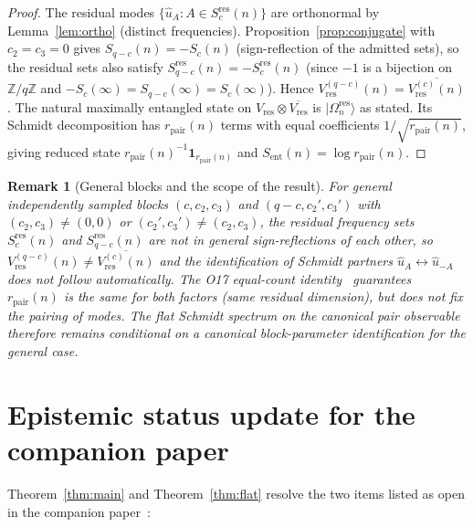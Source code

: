 \documentclass[11pt]{article}
\newtheorem{remark}{Remark}
\newcommand{\Sent}{S_{\mathrm{ent}}}
\newcommand{\rpair}{r_{\mathrm{pair}}}
\newcommand{\ue}{\hat{u}}
\begin{document}
    \begin{proof}
      The residual modes $\{\ue_A : A\in S_c^{\mathrm{res}}(n)\}$ are orthonormal by
      Lemma~\ref{lem:ortho} (distinct frequencies).
      Proposition~\ref{prop:conjugate} with $c_2=c_3=0$ gives $S_{q-c}(n)=-S_c(n)$
      (sign-reflection of the admitted sets), so the residual sets also satisfy
      $S_{q-c}^{\mathrm{res}}(n) = -S_c^{\mathrm{res}}(n)$ (since $-1$ is a bijection on
      $\mathbb{Z}/q\mathbb{Z}$ and $-S_c(\infty)=S_{q-c}(\infty)=S_c(\infty)$).
      Hence $V^{(q-c)}_{\mathrm{res}}(n)=\overline{V^{(c)}_{\mathrm{res}}(n)}$.
      The natural maximally entangled state on $V_{\mathrm{res}}\otimes\overline{V_{\mathrm{res}}}$
      is $|\Omega^{\mathrm{res}}_n\rangle$ as stated.
      Its Schmidt decomposition has $\rpair(n)$ terms with equal coefficients
      $1/\sqrt{\rpair(n)}$, giving reduced state $\rpair(n)^{-1}\mathbf{1}_{\rpair(n)}$ and
      $\Sent(n)=\log\rpair(n)$.
    \end{proof}

    \begin{remark}[General blocks and the scope of the result]
      \label{rem:general}
      For general independently sampled blocks $(c,c_2,c_3)$ and $(q-c,c_2',c_3')$ with
      $(c_2,c_3)\neq(0,0)$ or $(c_2',c_3')\neq(c_2,c_3)$, the residual frequency sets
      $S_c^{\mathrm{res}}(n)$ and $S_{q-c}^{\mathrm{res}}(n)$ are not in general sign-reflections
      of each other, so $V^{(q-c)}_{\mathrm{res}}(n)\neq\overline{V^{(c)}_{\mathrm{res}}(n)}$
      and the identification of Schmidt partners $\ue_A\leftrightarrow\ue_{-A}$ does not
      follow automatically.
      The \emph{O17} equal-count identity~\cite{Beau2026a21} guarantees
      $\rpair(n)$ is the same for both factors (same residual dimension), but
      does not fix the pairing of modes.
      The flat Schmidt spectrum on the canonical pair observable~\cite{Beau2026entnote}
      therefore remains conditional on a canonical block-parameter identification for the
      general case.
    \end{remark}

  \section{Epistemic status update for the companion paper}
    \label{sec:status}

    Theorem~\ref{thm:main} and Theorem~\ref{thm:flat} resolve the two items listed as open
    in the companion paper~\cite{Beau2026entnote}:
\end{document}
